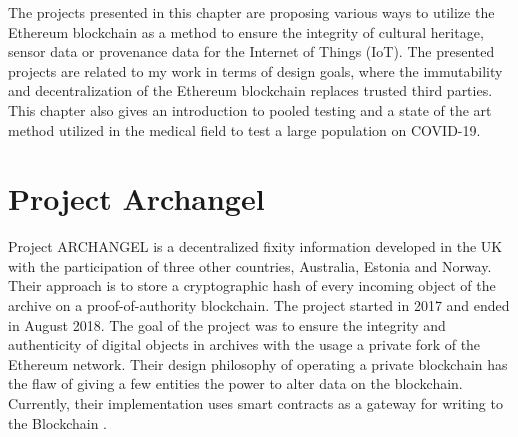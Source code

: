 The projects presented in this chapter are proposing various ways to utilize the Ethereum blockchain as a method to ensure the integrity of cultural heritage, sensor data or provenance data for the Internet of Things (IoT). The presented projects are related to my work in terms of design goals, where the immutability and decentralization of the Ethereum blockchain replaces trusted third parties. This chapter also gives an introduction to pooled testing and a state of the art method utilized in the medical field to test a large population on COVID-19.
\section{Project Archangel}
Project ARCHANGEL is a decentralized fixity information developed in the UK with the participation of three other countries, Australia, Estonia and Norway. Their approach is to store a cryptographic hash of every incoming object of the archive on a proof-of-authority blockchain. The project started in 2017 and ended in August 2018. The goal of the project was to ensure the integrity and authenticity of digital objects in archives with the usage a private fork of the Ethereum network. Their design philosophy of operating a private blockchain has the flaw of giving a few entities the power to alter data on the blockchain. Currently, their implementation uses smart contracts as a gateway for writing to the Blockchain \cite[4]{collomosse2018archangel}.

